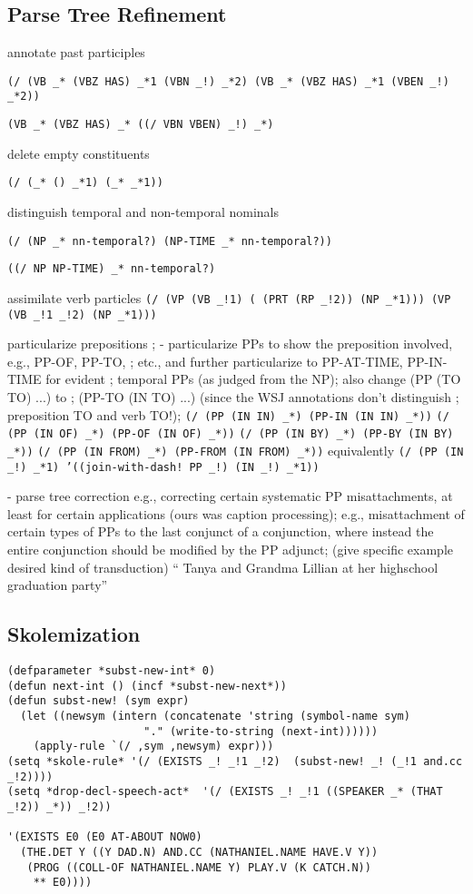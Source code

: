 \documentclass[11pt]{article}
\begin{document}
\subsection*{Parse Tree Refinement}
annotate past participles

\texttt{(/ (VB \_* (VBZ HAS) \_*1 (VBN \_!) \_*2) (VB \_* (VBZ HAS) \_*1 (VBEN \_!) \_*2))}

\texttt{(VB \_* (VBZ HAS) \_* ((/ VBN VBEN) \_!) \_*)}

delete empty constituents

\texttt{(/ (\_* () \_*1) (\_* \_*1))}

distinguish temporal and non-temporal nominals

\texttt{(/ (NP \_* nn-temporal?) (NP-TIME \_* nn-temporal?))}

\texttt{((/ NP NP-TIME) \_* nn-temporal?)}

assimilate verb particles
\texttt{(/ (VP (VB \_!1) ({} (PRT (RP \_!2)) (NP \_*1))) (VP (VB \_!1 \_!2)  (NP \_*1)))}



particularize prepositions
; - particularize PPs to show the preposition involved, e.g., PP-OF, PP-TO,
;   etc., and further particularize to PP-AT-TIME, PP-IN-TIME for evident
;   temporal PPs (as judged from the NP); also change (PP (TO TO) ...) to 
;   (PP-TO (IN TO) ...) (since the WSJ annotations don't distinguish 
;   preposition TO and verb TO!); 
\texttt{(/ (PP (IN IN) \_*) (PP-IN (IN IN) \_*))}
\texttt{(/ (PP (IN OF) \_*) (PP-OF (IN OF) \_*))}
\texttt{(/ (PP (IN BY) \_*) (PP-BY (IN BY) \_*))}
\texttt{(/ (PP (IN FROM) \_*) (PP-FROM (IN FROM) \_*))}
equivalently
\texttt{(/ (PP (IN \_!) \_*1) '((join-with-dash! PP \_!) (IN \_!) \_*1))}


 - parse tree correction
   e.g., correcting certain systematic PP misattachments, at least
         for certain applications (ours was caption processing);
         e.g., misattachment of certain types of PPs to the last
         conjunct of a conjunction, where instead the entire conjunction
         should be modified by the PP adjunct; (give specific example
         desired kind of transduction)
        `` Tanya and Grandma Lillian at her highschool graduation party''



\subsection*{Skolemization}
\begin{verbatim}
(defparameter *subst-new-int* 0)
(defun next-int () (incf *subst-new-next*))
(defun subst-new! (sym expr)			      
  (let ((newsym (intern (concatenate 'string (symbol-name sym) 
				     "." (write-to-string (next-int))))))
    (apply-rule `(/ ,sym ,newsym) expr)))
(setq *skole-rule* '(/ (EXISTS _! _!1 _!2)  (subst-new! _! (_!1 and.cc _!2))))
(setq *drop-decl-speech-act*  '(/ (EXISTS _! _!1 ((SPEAKER _* (THAT _!2)) _*)) _!2))

'(EXISTS E0 (E0 AT-ABOUT NOW0)
  (THE.DET Y ((Y DAD.N) AND.CC (NATHANIEL.NAME HAVE.V Y))
   (PROG ((COLL-OF NATHANIEL.NAME Y) PLAY.V (K CATCH.N))
    ** E0))))
\end{verbatim}
\end{document}
